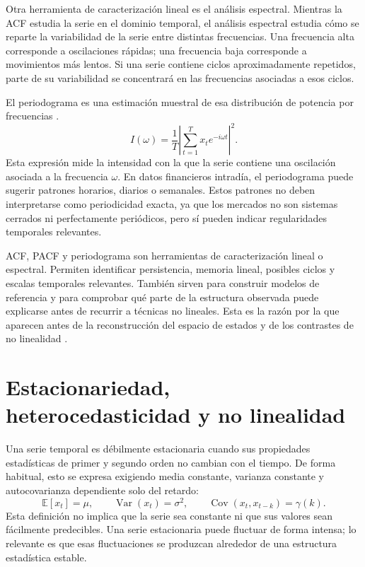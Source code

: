 Otra herramienta de caracterización lineal es el análisis espectral. Mientras la ACF estudia la serie en el dominio temporal, el análisis espectral estudia cómo se reparte la variabilidad de la serie entre distintas frecuencias. Una frecuencia alta corresponde a oscilaciones rápidas; una frecuencia baja corresponde a movimientos más lentos. Si una serie contiene ciclos aproximadamente repetidos, parte de su variabilidad se concentrará en las frecuencias asociadas a esos ciclos.

El periodograma es una estimación muestral de esa distribución de potencia por frecuencias \cite{brockwell2002,priestley1981}.
\begin{equation}
    I(\omega)=\frac{1}{T}\left|\sum_{t=1}^{T} x_t e^{-i\omega t}\right|^2.
\end{equation}
Esta expresión mide la intensidad con la que la serie contiene una oscilación asociada a la frecuencia \(\omega\). En datos financieros intradía, el periodograma puede sugerir patrones horarios, diarios o semanales. Estos patrones no deben interpretarse como periodicidad exacta, ya que los mercados no son sistemas cerrados ni perfectamente periódicos, pero sí pueden indicar regularidades temporales relevantes.

ACF, PACF y periodograma son herramientas de caracterización lineal o espectral. Permiten identificar persistencia, memoria lineal, posibles ciclos y escalas temporales relevantes. También sirven para construir modelos de referencia y para comprobar qué parte de la estructura observada puede explicarse antes de recurrir a técnicas no lineales. Esta es la razón por la que aparecen antes de la reconstrucción del espacio de estados y de los contrastes de no linealidad \cite{brockwell2002,olmedo2001}.

\section{Estacionariedad, heterocedasticidad y no linealidad}\label{sec:estacionariedad-heterocedasticidad}

Una serie temporal es débilmente estacionaria cuando sus propiedades estadísticas de primer y segundo orden no cambian con el tiempo. De forma habitual, esto se expresa exigiendo media constante, varianza constante y autocovarianza dependiente solo del retardo:
\begin{equation}
    \mathbb{E}[x_t]=\mu,\qquad 
    \operatorname{Var}(x_t)=\sigma^2,\qquad 
    \operatorname{Cov}(x_t,x_{t-k})=\gamma(k).
\end{equation}
Esta definición no implica que la serie sea constante ni que sus valores sean fácilmente predecibles. Una serie estacionaria puede fluctuar de forma intensa; lo relevante es que esas fluctuaciones se produzcan alrededor de una estructura estadística estable.

